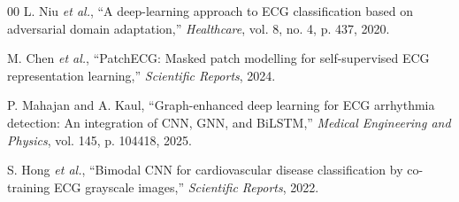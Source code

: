 \documentclass[journal]{IEEEtran}
\begin{document}
\begin{thebibliography}{00}
L. Niu \textit{et al.}, ``A deep-learning approach to ECG classification
based on adversarial domain adaptation,'' \textit{Healthcare}, vol. 8,
no. 4, p. 437, 2020.

M. Chen \textit{et al.}, ``PatchECG: Masked patch modelling for
self-supervised ECG representation learning,'' \textit{Scientific
Reports}, 2024.

P. Mahajan and A. Kaul, ``Graph-enhanced deep learning for ECG
arrhythmia detection: An integration of CNN, GNN, and BiLSTM,''
\textit{Medical Engineering and Physics}, vol. 145, p. 104418, 2025.

S. Hong \textit{et al.}, ``Bimodal CNN for cardiovascular disease
classification by co-training ECG grayscale images,'' \textit{Scientific
Reports}, 2022.

\end{thebibliography}
\end{document}
